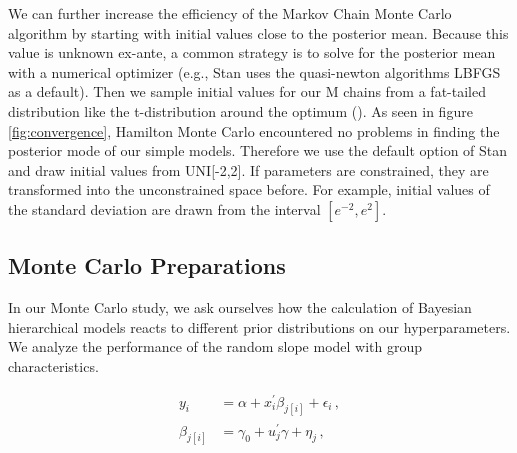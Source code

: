 We can further increase the efficiency of the Markov Chain Monte Carlo algorithm by starting with initial values close to the posterior mean. Because this value is unknown ex-ante, a common strategy is to solve for the posterior mean with a numerical optimizer (e.g., Stan uses the quasi-newton algorithms LBFGS as a default). Then we sample initial values for our M chains from a fat-tailed distribution like the t-distribution around the optimum (\cite{brooks1998}).
As seen in figure \ref{fig:convergence}, Hamilton Monte Carlo encountered no problems in finding the posterior mode of our simple models. Therefore we use the default option of Stan and draw initial values from UNI[-2,2]. If parameters are constrained, they are transformed into the unconstrained space before. For example, initial values of the standard deviation are drawn from the interval $[e^{-2},e^2]$.




\subsection{Monte Carlo Preparations}
In our Monte Carlo study, we ask ourselves how the calculation of Bayesian hierarchical models reacts to different prior distributions on our hyperparameters.
We analyze the performance of the random slope model with group characteristics.

\begin{align}
y_i &= \alpha+ x_i^\prime \beta_{j[i]} + \epsilon_i \,,\\
\beta_{j[i]} &= \gamma_0 + u_j^\prime \gamma + \eta_j \,,
\end{align}

